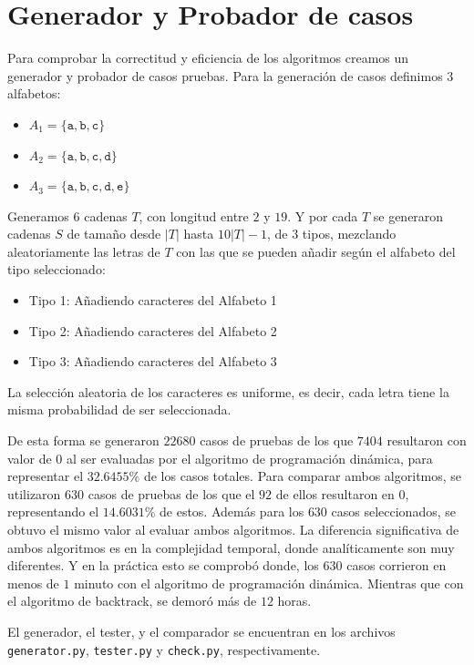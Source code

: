 \documentclass[a4paper]{article}
\begin{document}
	\section*{Generador y Probador de casos}
	
	Para comprobar la correctitud y eficiencia de los algoritmos creamos un generador y probador de casos pruebas. Para la generación de casos definimos 3 alfabetos:
	\begin{itemize}
		\item $A_1 = \{\texttt{a},\texttt{b},\texttt{c}\}$
		\item $A_2 = \{\texttt{a},\texttt{b},\texttt{c},\texttt{d}\}$
		\item $A_3 = \{\texttt{a},\texttt{b},\texttt{c},\texttt{d},\texttt{e}\}$
	\end{itemize}

	Generamos $6$ cadenas $T$, con longitud entre $2$ y $19$. Y por cada $T$ se generaron cadenas $S$ de tamaño desde $|T|$ hasta $10|T|-1$, de $3$ tipos, mezclando aleatoriamente las letras de $T$ con las que se pueden añadir según el alfabeto del tipo seleccionado:
	\begin{itemize}
	\item Tipo 1: Añadiendo caracteres del Alfabeto 1
	\item Tipo 2: Añadiendo caracteres del Alfabeto 2
	\item Tipo 3: Añadiendo caracteres del Alfabeto 3
	\end{itemize}
	La selección aleatoria de los caracteres es uniforme, es decir, cada letra tiene la misma probabilidad de ser seleccionada.
	
	De esta forma se generaron $22680$ casos de pruebas de los que $7404$ resultaron con valor de $0$ al ser evaluadas por el algoritmo de programación dinámica, para representar el $32.6455\%$ de los casos totales. Para comparar ambos algoritmos, se utilizaron $630$ casos de pruebas de los que el $92$ de ellos resultaron en $0$, representando el $14.6031\%$ de estos. Además para los $630$ casos seleccionados, se obtuvo el mismo valor al evaluar ambos algoritmos. La diferencia significativa de ambos algoritmos es en la complejidad temporal, donde analíticamente son muy diferentes. Y en la práctica esto se comprobó donde, los $630$ casos corrieron en menos de $1$ minuto con el algoritmo de programación dinámica. Mientras que con el algoritmo de backtrack, se demoró más de $12$ horas.
	
	El generador, el tester, y el comparador se encuentran en los archivos \texttt{generator.py}, \texttt{tester.py} y \texttt{check.py}, respectivamente.
\end{document}
